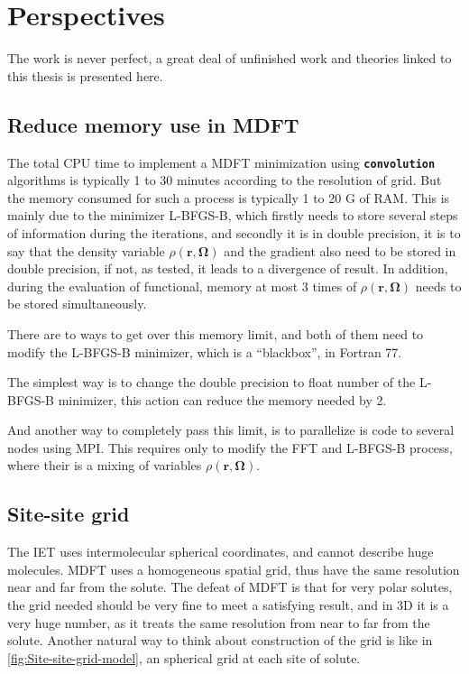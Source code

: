 
\chapter{Perspectives\label{chpt:perspectives}}

The work is never perfect, a great deal of unfinished work and theories
linked to this thesis is presented here. 

\section{Reduce memory use in MDFT}

The total CPU time to implement a MDFT minimization using \texttt{\textbf{convolution}}
algorithms is typically 1 to 30 minutes according to the resolution
of grid. But the memory consumed for such a process is typically 1
to 20 G of RAM. This is mainly due to the minimizer L-BFGS-B, which
firstly needs to store several steps of information during the iterations,
and secondly it is in double precision, it is to say that the density
variable $\rho(\mathbf{r},\mathbf{\Omega})$ and the gradient also
need to be stored in double precision, if not, as tested, it leads
to a divergence of result. In addition, during the evaluation of functional,
memory at most 3 times of $\rho(\mathbf{r},\mathbf{\Omega})$ needs
to be stored simultaneously.

There are to ways to get over this memory limit, and both of them
need to modify the L-BFGS-B minimizer, which is a ``blackbox'',
in Fortran 77. 

The simplest way is to change the double precision to float number
of the L-BFGS-B minimizer, this action can reduce the memory needed
by 2. 

And another way to completely pass this limit, is to parallelize is
code to several nodes using MPI. This requires only to modify the
\acs{FFT} and L-BFGS-B process, where their is a mixing of variables
$\rho(\mathbf{r},\mathbf{\Omega})$.

\section{Site-site grid}

The \acs{IET} uses intermolecular spherical coordinates, and cannot
describe huge molecules. \acs{MDFT} uses a homogeneous spatial grid,
thus have the same resolution near and far from the solute. The defeat
of \acs{MDFT} is that for very polar solutes, the grid needed should
be very fine to meet a satisfying result, and in 3D it is a very huge
number, as it treats the same resolution from near to far from the
solute. Another natural way to think about construction of the grid
is like in \ref{fig:Site-site-grid-model}, an spherical grid at each
site of solute. 

